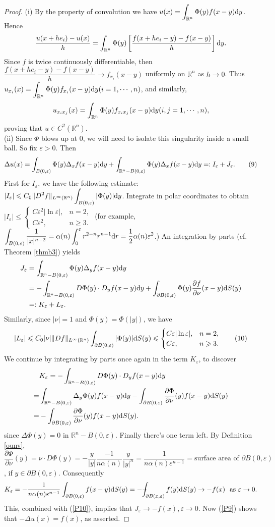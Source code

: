 \documentclass[hyperref,UTF8,12pt]{article}
\numberwithin{equation}{subsection}
\theoremstyle{plain}
\theoremstyle{definition}
\numberwithin{theorem}{section}
\numberwithin{lemma}{section}
\numberwithin{proposition}{section}
\numberwithin{remark}{section}
\numberwithin{corollary}{section}
\numberwithin{definition}{section}
\numberwithin{problem}{section}
\numberwithin{example}{section}
\def\dif{\textup{d}}
\def\Xint#1{\mathchoice
	{\XXint\displaystyle\textstyle{#1}}%
	{\XXint\textstyle\scriptstyle{#1}}%
	{\XXint\scriptstyle\scriptscriptstyle{#1}}%
	{\XXint\scriptscriptstyle\scriptscriptstyle{#1}}%
	\!\int}
\def\XXint#1#2#3{{\setbox0=\hbox{$#1{#2#3}{\int}$ }
		\vcenter{\hbox{$#2#3$ }}\kern-.55\wd0}}
\def\dashint{\Xint-}
\newcommand{\dis}{\displaystyle}
\newcommand{\ptl}{\partial}
\newcommand{\mr}{\mathbb{R}}
\renewcommand{\leq}{\leqslant}
\renewcommand{\geq}{\geqslant}
\newcommand{\ve}{\varepsilon}
\begin{document}
\begin{proof}
(i) By the property of convolution we have $u(x)=\dis\int_{\mr^n}\Phi(y)f(x-y)\dif y$. Hence\[\frac{u(x+he_i)-u(x)}{h}=\int_{\mr^n}\Phi(y)\left[\frac{f(x+he_i-y)-f(x-y)}{h}\right]\dif y.\]Since $f$ is twice continuously differentiable, then $\dfrac{f(x+he_i-y)-f(x-y)}{h}\to f_{x_i}(x-y)$ uniformly on $\mr^n$ as $h\to0$. Thus $u_{x_i}(x)=\dis\int_{\mr^n}\Phi(y) f_{x_i}(x-y)\dif y(i=1,\cdots,n)$, and similarly, \[
u_{x_ix_j}(x)=\int_{\mr^n}\Phi(y)f_{x_ix_j}(x-y)\dif y(i,j=1,\cdots,n),\]proving that $u\in C^2(\mr^n)$.\\
(ii) Since $\Phi$ blows up at 0, we will need to isolate this singularity inside a small ball. So fix $\ve>0$. Then \[\Delta u(x)=\int_{B(0,\ve)}\Phi(y)\Delta_xf(x-y)\dif y+\int_{\mr^n-B(0,\ve)}\Phi(y)\Delta_xf(x-y)\dif y=:I_\ve+J_\ve.\tag{9}\label{P9}\] First for $I_\ve$, we have the following estimate: $\dis|I_\ve|\leq C_0\|D^2f\|_ {L^\infty(\mr^n)}\int_{B(0,\ve)}|\Phi(y)|\dif y$. Integrate in polar coordinates to obtain $|I_\ve|\leq\begin{cases}
C\ve^2|\ln\ve|,&n=2,\\C\ve^2,&n\geq3.
\end{cases}$ (for example, $\dis\int_{B(0,\ve)}\frac{1}{|x|^{n-2}}=\alpha(n)\int_0^\ve r^{2-n}r^{n-1}\dif r=\frac{1}{2}\alpha(n)\ve^2$.) An integration by parts (cf. Theorem \ref{thmb3}) yields\[\begin{aligned}
	J_\ve&=\int_{\mr^n-B(0,\ve)}\Phi(y)\Delta_y f(x-y)\dif y\\
	&=-\int_{\mr^n-B(0,\ve)}D\Phi(y)\cdot D_y f(x-y)\dif y+\int_{\ptl B(0,\ve)}\Phi(y)\frac{\ptl f}{\ptl\nu}(x-y)\dif S(y) \\
	&=:K_\ve+L_\ve.
\end{aligned}\]Similarly, since $|\nu|=1$ and $\Phi(y)=\Phi(|y|)$, we have\[|L_\ve|\leq C_0|\nu|\|Df\|_{L^\infty(\mr^n)}\int_{\ptl B(0,\ve)}|\Phi(y)|\dif S(y)\leq\begin{cases}
C\ve|\ln\ve|,&n=2,\\C\ve,&n\geq3.\end{cases}\label{P10}\tag{10}\]
We continue by integrating by parts once again in the term $K_\ve$, to discover\[\begin{aligned}
	&K_\ve=-\int_{\mr^n-B(0,\ve)}D\Phi(y)\cdot D_y f(x-y)\dif y\\
	=&\int_{\mr^n-B(0,\ve)}\Delta_y\Phi(y)f(x-y)\dif y-\int_{\ptl B(0,\ve)}\frac{\ptl\Phi}{\ptl\nu}(y)f(x-y)\dif S(y)\\
	=&-\int_{\ptl B(0,\ve)}\frac{\ptl\Phi}{\ptl\nu}(y)f(x-y)\dif S(y).
\end{aligned}\]since $\Delta\Phi(y)=0$ in $\mr^n-B(0,\ve)$. Finally there's one term left. By Definition \ref{ounv}, $\dfrac{\ptl\Phi}{\ptl\nu}(y)=\nu\cdot D\Phi(y)=-\dfrac{y}{|y|}\dfrac{-1}{n\alpha(n)}\dfrac{y}{|y|^n}=\dfrac{1}{n\alpha(n)\ve^{n-1}}=\text{surface area of~}\ptl B(0,\ve)$, if $y\in\ptl B(0,\ve)$. Consequently \[K_\ve=-
\frac{1}{n\alpha(n)\ve^{n-1}}\int_{\ptl B(0,\ve)}f(x-y)\dif S(y)=-\dashint_{\ptl B(x,\ve)}f(y)\dif S(y)\to-f(x)~\text{~as } \ve\to0.\]This, combined with (\ref{P10}), implies that $J_\ve\to-f(x),\ve\to0$. Now (\ref{P9}) shows that $-\Delta u(x)=f(x)$, as asserted.
\end{proof}
\end{document}
